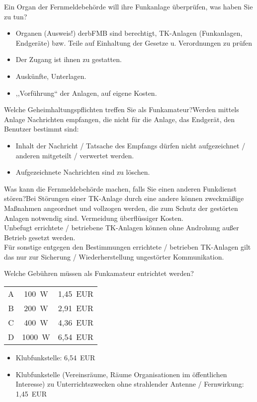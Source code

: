 \documentclass[avery5371,grid,frame,a4paper]{flashcards}
\newcommand{\card}[3]{
  \begin{flashcard}[{\chap} -- #1]{#2}#3\end{flashcard}
}
\begin{document}
\card{14}{Ein Organ der Fernmeldebehörde will ihre Funkanlage überprüfen, was haben Sie zu tun?}{\begin{itemize}\itemsep1pt \item Organen (Ausweis!) derbFMB sind berechtigt, TK-Anlagen (Funkanlagen, Endgeräte) bzw. Teile auf Einhaltung der Gesetze u. Verordnungen zu prüfen \item Der Zugang ist ihnen zu gestatten. \item Auskünfte, Unterlagen. \item			,,Vorführung`` der Anlagen, auf eigene Kosten. \end{itemize}}

\card{14}{ Welche Geheimhaltungspflichten treffen Sie als Funkamateur?}{Werden mittels Anlage Nachrichten empfangen, die nicht für die Anlage, das Endgerät, den Benutzer bestimmt sind:\begin{itemize}\itemsep1pt \item Inhalt der Nachricht / Tatsache des Empfangs dürfen nicht aufgezeichnet / anderen mitgeteilt / verwertet	werden. \item Aufgezeichnete Nachrichten sind zu löschen.\end{itemize}}

\card{16}{Was kann die Fernmeldebehörde machen, falls Sie einen anderen Funkdienst stören?}{Bei Störungen einer TK-Anlage durch eine andere können zweckmäßige Maßnahmen angeordnet und vollzogen werden, die zum Schutz der gestörten	Anlagen notwendig sind. Vermeidung überflüssiger Kosten. \\ Unbefugt errichtete / betriebene TK-Anlagen können ohne Androhung außer Betrieb gesetzt werden. \\ Für sonstige entgegen den Bestimmungen errichtete / betrieben TK-Anlagen gilt das nur zur Sicherung / Wiederherstellung ungestörter Kommunikation.}

\card{17}{Welche Gebühren müssen als Funkamateur entrichtet werden?}{
  \begin{tabular}{ccc}
    A & 100~W & 1,45~EUR \\
    B & 200~W & 2,91~EUR \\
    C & 400~W & 4,36~EUR \\
    D & 1000~W & 6,54~EUR
  \end{tabular}
  \begin{itemize}
    \item Klubfunkstelle: 6,54~EUR
    \item Klubfunkstelle (Vereinsräume, Räume Organisationen im öffentlichen Interesse) zu Unterrichtszwecken ohne strahlender Antenne / Fernwirkung: 1,45~EUR
  \end{itemize}
}
\end{document}
